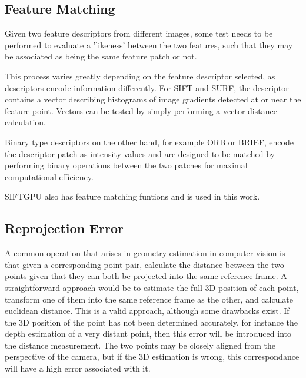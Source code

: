 
\subsection{Feature Matching}

Given two feature descriptors from different images, some test needs to be performed to evaluate a 'likeness' between the two features, such that they may be associated as being the same feature patch or not.

This process varies greatly depending on the feature descriptor selected, as descriptors encode information differently.  For SIFT and SURF, the descriptor contains a vector describing histograms of image gradients detected at or near the feature point.  Vectors can be tested by simply performing a vector distance calculation.

Binary type descriptors on the other hand, for example ORB or BRIEF, encode the descriptor patch as intensity values and are designed to be matched by performing binary operations between the two patches for maximal computational efficiency.

SIFTGPU also has feature matching funtions and is used in this work.

\subsection{Reprojection Error}
\label{subsec:reprojection_error}

A common operation that arises in geometry estimation in computer vision is that given a corresponding point pair, calculate the distance between the two points given that they can both be projected into the same reference frame.  A straightforward approach would be to estimate the full 3D position of each point, transform one of them into the same reference frame as the other, and calculate euclidean distance.  This is a valid approach, although some drawbacks exist.  If the 3D position of the point has not been determined accurately, for instance the depth estimation of a very distant point, then this error will be introduced into the distance measurement.  The two points may be closely aligned from the perspective of the camera, but if the 3D estimation is wrong, this correspondance will have a high error associated with it.

